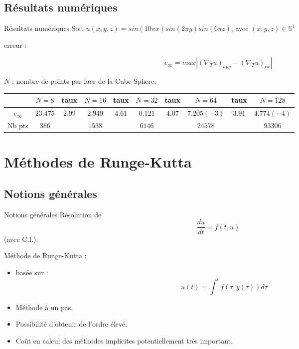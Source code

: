 \documentclass[11pt]{beamer}
\begin{document}
\subsection{Résultats numériques}
\begin{frame}{Résultats numériques}
Soit $u(x,y,z) = sin(10 \pi x)sin(2 \pi y) sin(6 \pi z)$, avec
$(x,y,z) \in \mathbb{S}^1$

erreur :

$$e_{\infty} = max | (\nabla_T u)_{app} - (\nabla_T u)_{ex} |$$

$N$ : nombre de points par face de la Cube-Sphere.

\begin{center}
\tiny{\begin{tabular}{|c||c|c|c|c|c|c|c|c|c|}
\hline 
 & $N=8$ & taux & $N=16$ & taux & $N=32$ & taux & $N=64$ & taux & $N=128$ \\ 
\hline 
\hline
$e_{\infty}$ & $23.475$ & $2.99$ & $2.949$ & $4.61$ & $0.121$ & $4.07$ & $7.205(-3)$ & $3.91$ & $4.774(-4)$ \\ 
\hline 
Nb pts & $386$ &  & $1538$ &  & $6146$ &  & $24578$ &  &
$93306$\\
\hline
\end{tabular} }
\end{center}

\end{frame}


\section{Méthodes de Runge-Kutta}

\subsection{Notions générales}
\begin{frame}{Notions générales}
Résolution de $$\dfrac{du}{dt} = f(t,u)$$ (avec C.I.).

\begin{block}{}
Méthode de Runge-Kutta :
\begin{itemize}
\item basée sur :
$$u(t) = \int^t f(\tau,y(\tau))d\tau$$
\item Méthode à un pas,
\item Possibilité d'obtenir de l'ordre élevé.
\item Co\^ut en calcul des méthodes implicites potentiellement très important.
\end{itemize}
\end{block}

\end{frame}
\end{document}
